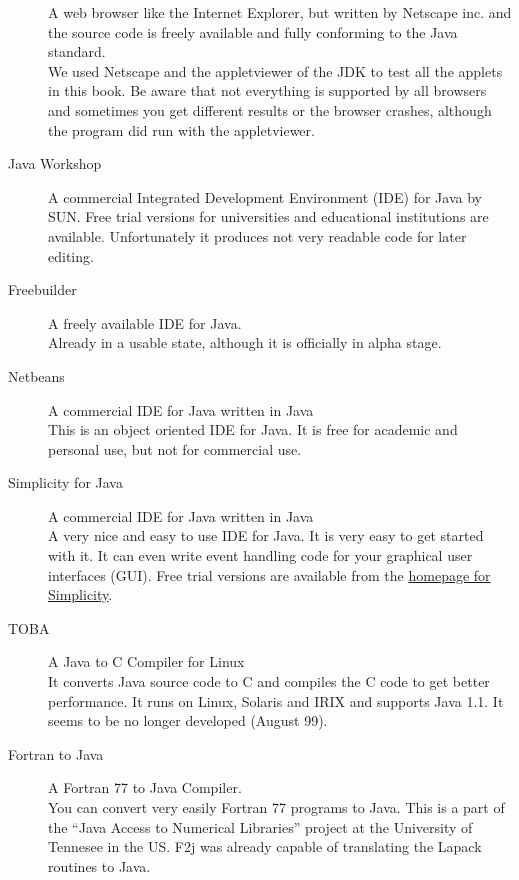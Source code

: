 \begin{description}
  A web browser like the Internet 
  Explorer, but written by Netscape inc. and the source code is
  freely available and fully conforming to the Java standard. \\
  We used Netscape and the appletviewer of the JDK to test all
  the applets in this book.
  Be aware that not everything is supported by all browsers and
  sometimes you get different results or the browser crashes,
  although the program did run with the appletviewer.
\item[Java Workshop] A commercial Integrated 
    Development Environment (IDE)        
  for Java by SUN. Free trial versions
  for universities and educational institutions are available.
        Unfortunately it produces not very readable code for later
        editing.  
\item[Freebuilder] A freely available IDE for Java. \\
  Already in a usable state, although it is officially in alpha stage.
\item[Netbeans] A commercial IDE for Java written in Java \\
  This is an object oriented IDE for Java. It is free for academic and 
  personal use, but not for commercial use.
\item[Simplicity for Java] 
  A commercial IDE for Java written in  Java\\
  A very nice and easy to use IDE for Java. It is very easy to get started
  with it. It can even write event handling code for your 
  graphical user interfaces (GUI). Free trial versions are available
  from the \href{http://www.datarepresentations.com/}{homepage for Simplicity}.
\item[TOBA]  A Java to C Compiler for Linux\\
  It converts Java source code to C and compiles the C code to get better
  performance. It runs on Linux, Solaris and IRIX and supports Java 1.1.
  It seems to be no longer developed (August 99).
\item[Fortran to Java]  A Fortran 77 to Java Compiler. \\
  You can convert very easily Fortran 77 programs to Java. This is a part of the
  ``Java Access to Numerical Libraries'' project at the University of 
  Tennesee in the US. F2j was already capable of translating the
  Lapack routines to Java.
\end{description}

